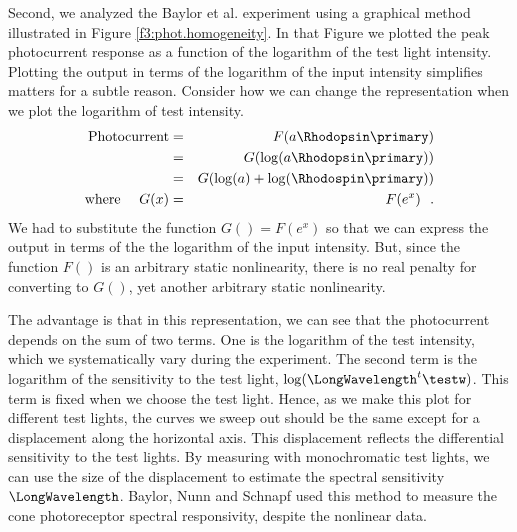 
Second, we analyzed the Baylor et al. experiment
using a graphical method illustrated in Figure \ref{f3:phot.homogeneity}.
In that Figure we plotted the peak
photocurrent response as a function of the logarithm of
the test light intensity.
Plotting the output in terms of the
logarithm of the input intensity simplifies matters
for a subtle reason.
Consider how we can change the representation
when we plot the logarithm of test intensity.
\begin{eqnarray}
\mbox{Photocurrent} & = & F( a \Rhodopsin \primary ) \nonumber \\
  & = & G( \log( a \Rhodopsin \primary)) \nonumber \\
  & = & G( \log( a ) + \log ( \Rhodospin \primary) ) \nonumber \\
\mbox{where}~~~~G(x) & = & F( e^{x})~~.
\end{eqnarray}
We had to substitute the function $G() =  F( e^{x} )$ so that we
can express the output in terms of the the logarithm of the input intensity.
But, since the function $F()$ is an arbitrary static nonlinearity,
there is no real penalty for converting to $G()$, yet another
arbitrary static nonlinearity.

The advantage is that
in this representation, 
we can see that the photocurrent depends
on the sum of two terms.
One is the logarithm of the test intensity, which
we systematically vary during the experiment.
The second term is
the logarithm of the sensitivity to the
test light, $\log ( \LongWavelength^t \testw)$.
This term is fixed when we choose the test light.
Hence, as we make this plot for different
test lights, the curves we sweep out should be the same
except for a displacement along the horizontal
axis.
This displacement reflects
the differential sensitivity to the test lights.
By measuring with monochromatic test lights,
we can use the size of the displacement
to estimate the
spectral sensitivity $\LongWavelength$.
Baylor, Nunn and Schnapf used this method to measure
the cone photoreceptor spectral responsivity,
despite the nonlinear data.
